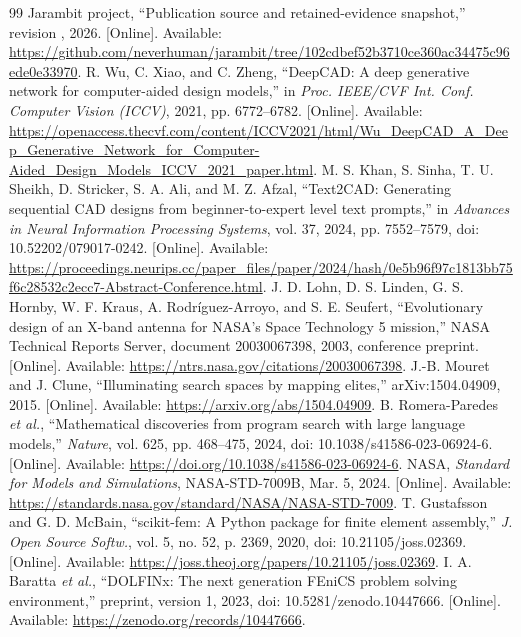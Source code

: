 \begin{thebibliography}{99}
 Jarambit project, ``Publication source and retained-evidence snapshot,'' revision , 2026. [Online]. Available: \url{https://github.com/neverhuman/jarambit/tree/102cdbef52b3710ce360ac34475c96ede0e33970}.
 R. Wu, C. Xiao, and C. Zheng, ``DeepCAD: A deep generative network for computer-aided design models,'' in \emph{Proc. IEEE/CVF Int. Conf. Computer Vision (ICCV)}, 2021, pp. 6772--6782. [Online]. Available: \url{https://openaccess.thecvf.com/content/ICCV2021/html/Wu_DeepCAD_A_Deep_Generative_Network_for_Computer-Aided_Design_Models_ICCV_2021_paper.html}.
 M. S. Khan, S. Sinha, T. U. Sheikh, D. Stricker, S. A. Ali, and M. Z. Afzal, ``Text2CAD: Generating sequential CAD designs from beginner-to-expert level text prompts,'' in \emph{Advances in Neural Information Processing Systems}, vol. 37, 2024, pp. 7552--7579, doi: 10.52202/079017-0242. [Online]. Available: \url{https://proceedings.neurips.cc/paper_files/paper/2024/hash/0e5b96f97c1813bb75f6c28532c2ecc7-Abstract-Conference.html}.
 J. D. Lohn, D. S. Linden, G. S. Hornby, W. F. Kraus, A. Rodr\'{i}guez-Arroyo, and S. E. Seufert, ``Evolutionary design of an X-band antenna for NASA's Space Technology 5 mission,'' NASA Technical Reports Server, document 20030067398, 2003, conference preprint. [Online]. Available: \url{https://ntrs.nasa.gov/citations/20030067398}.
 J.-B. Mouret and J. Clune, ``Illuminating search spaces by mapping elites,'' arXiv:1504.04909, 2015. [Online]. Available: \url{https://arxiv.org/abs/1504.04909}.
 B. Romera-Paredes \emph{et al.}, ``Mathematical discoveries from program search with large language models,'' \emph{Nature}, vol. 625, pp. 468--475, 2024, doi: 10.1038/s41586-023-06924-6. [Online]. Available: \url{https://doi.org/10.1038/s41586-023-06924-6}.
 NASA, \emph{Standard for Models and Simulations}, NASA-STD-7009B, Mar. 5, 2024. [Online]. Available: \url{https://standards.nasa.gov/standard/NASA/NASA-STD-7009}.
 T. Gustafsson and G. D. McBain, ``scikit-fem: A Python package for finite element assembly,'' \emph{J. Open Source Softw.}, vol. 5, no. 52, p. 2369, 2020, doi: 10.21105/joss.02369. [Online]. Available: \url{https://joss.theoj.org/papers/10.21105/joss.02369}.
 I. A. Baratta \emph{et al.}, ``DOLFINx: The next generation FEniCS problem solving environment,'' preprint, version 1, 2023, doi: 10.5281/zenodo.10447666. [Online]. Available: \url{https://zenodo.org/records/10447666}.

\end{thebibliography}

